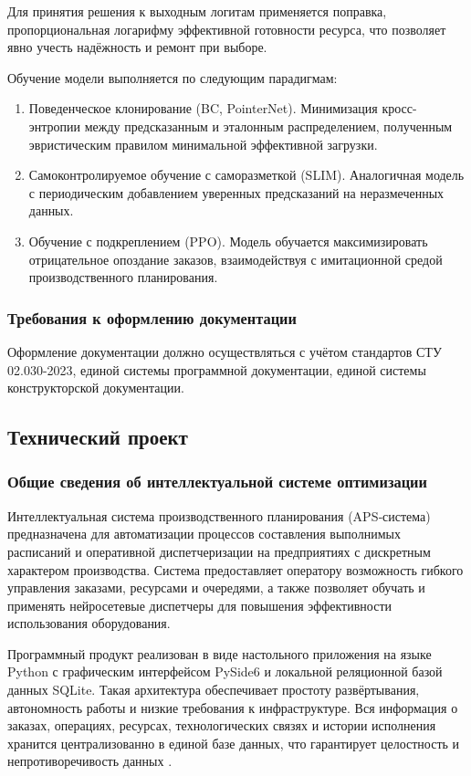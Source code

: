 Для принятия решения к выходным логитам применяется поправка, пропорциональная логарифму эффективной готовности ресурса, что позволяет явно учесть надёжность и ремонт при выборе.

Обучение модели выполняется по следующим парадигмам:

\begin{enumerate}
\item Поведенческое клонирование (BC, PointerNet). Минимизация кросс-энтропии между предсказанным и эталонным распределением, полученным эвристическим правилом минимальной эффективной загрузки.
\item Самоконтролируемое обучение с саморазметкой (SLIM). Аналогичная модель с периодическим добавлением уверенных предсказаний на неразмеченных данных.
\item Обучение с подкреплением (PPO). Модель обучается максимизировать отрицательное опоздание заказов, взаимодействуя с имитационной средой производственного планирования. 
\end{enumerate}

\subsubsection{Требования к оформлению документации}

Оформление документации должно осуществляться с учётом стандартов СТУ 02.030-2023, единой системы программной документации, единой системы конструкторской документации.

\subsection{Технический проект}                      %
\subsubsection{Общие сведения об интеллектуальной системе оптимизации}

Интеллектуальная система производственного планирования (APS‑система) предназначена для автоматизации процессов составления выполнимых расписаний и оперативной диспетчеризации на предприятиях с дискретным характером производства. Система предоставляет оператору возможность гибкого управления заказами, ресурсами и очередями, а также позволяет обучать и применять нейросетевые диспетчеры для повышения эффективности использования оборудования.

Программный продукт реализован в виде настольного приложения на языке Python с графическим интерфейсом PySide6 и локальной реляционной базой данных SQLite. Такая архитектура обеспечивает простоту развёртывания, автономность работы и низкие требования к инфраструктуре. Вся информация о заказах, операциях, ресурсах, технологических связях и истории исполнения хранится централизованно в единой базе данных, что гарантирует целостность и непротиворечивость данных \cite{isakova}.

